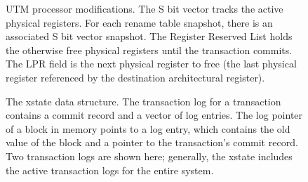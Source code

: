 

\begin{figure}[b]
\hspace{-0.15cm}

\caption[UTM processor modifications.]%
{UTM processor modifications. The S bit vector
tracks the active physical registers.  For each rename table snapshot,
there is an associated S bit vector snapshot.  The Register Reserved
List holds the otherwise free physical registers until the transaction
commits.  The LPR field is the next physical register to free (the
last physical register referenced by the destination architectural
register).}
\label{fig:snapshot-utm}
\end{figure}
\begin{figure}[b]
\hspace{-1.3cm} %

\caption[The xstate data structure.]{The xstate data structure.
The transaction log for a transaction contains a commit record and a
vector of log entries.  The log pointer of a block in memory
points to a log entry, which contains the old value of the block and a
pointer to the transaction's commit record.  Two transaction logs
are shown here; generally, the xstate includes the active
transaction logs for the entire system.}
\label{fig:datastruct-entry}
\end{figure}

